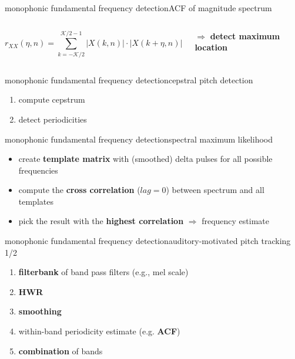 	\begin{frame}{monophonic fundamental frequency detection}{ACF of magnitude spectrum}
        \vspace{-3mm}
        \begin{columns}
        \begin{footnotesize}
		\begin{equation*}
			r_{XX}(\eta,n) = \sum\limits_{k=-\mathcal{K}/2}^{\mathcal{K}/2-1}{|X(k,n)|\cdot |X(k+\eta,n)|}
		\end{equation*}
        \end{footnotesize}
		$\Rightarrow$ \textbf{detect maximum location}
        
        \end{columns}
	\end{frame}
	
	\begin{frame}{monophonic fundamental frequency detection}{cepstral pitch detection}
		\begin{enumerate}
			\item	compute cepstrum
			\item	detect periodicities
		\end{enumerate}
	\end{frame}
	
	\begin{frame}{monophonic fundamental frequency detection}{spectral maximum likelihood}
        \vspace{-2mm}
        \begin{itemize}
            \item   create \textbf{template matrix} with (smoothed) delta pulses for all possible frequencies
            
            \item<2->   compute the \textbf{cross correlation} ($lag=0$) between spectrum and all templates
            
            \item<3->   pick the result with the \textbf{highest correlation} $\Rightarrow$ frequency estimate %
        \end{itemize}
	\end{frame}
	
	\begin{frame}{monophonic fundamental frequency detection}{auditory-motivated pitch tracking 1/2}
		\begin{enumerate}
			\item	\textbf{filterbank} of band pass filters (e.g., mel scale)
			\item<2->	\textbf{HWR}
			\item<3->	\textbf{smoothing}
			\item<4->	within-band periodicity estimate (e.g. \textbf{ACF})
			\item<5->	\textbf{combination} of bands
		\end{enumerate}
	\end{frame}
	
